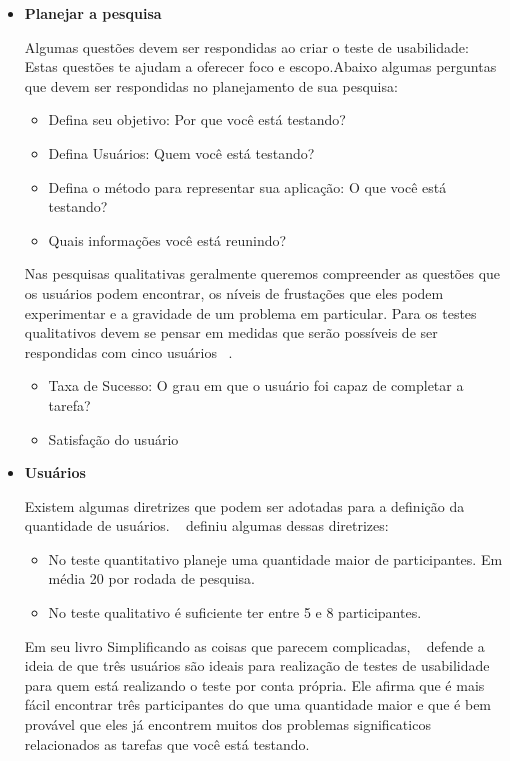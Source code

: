 \begin{itemize}
\item \textbf{Planejar a pesquisa}

Algumas questões devem ser respondidas ao criar o teste de usabilidade: Estas questões te ajudam a oferecer foco e escopo.Abaixo algumas perguntas que devem ser respondidas no planejamento de sua pesquisa:

\begin{itemize}
\item Defina seu objetivo: Por que você está testando? %
\item Defina Usuários: Quem você está testando? %
\item Defina o método para representar sua aplicação: O que você está testando?
\item Quais informações você está reunindo? 
\end{itemize}

Nas pesquisas qualitativas geralmente queremos compreender as questões que os usuários podem encontrar, os níveis de frustações que eles podem experimentar e a gravidade de um problema em particular. Para os testes qualitativos devem se pensar em medidas que serão possíveis de ser respondidas com cinco usuários ~\cite{unger2009}. 

	\begin{itemize}
		\item Taxa de Sucesso: O grau em que o usuário foi capaz de completar a tarefa?
		\item Satisfação do usuário
	\end{itemize}

\item \textbf{Usuários}

Existem algumas diretrizes que podem ser adotadas para a definição da quantidade de usuários. ~ definiu algumas dessas diretrizes:

\begin{itemize}
\item No teste quantitativo planeje uma quantidade maior de participantes. Em média 20 por rodada de pesquisa.
\item No teste qualitativo é suficiente ter entre 5 e 8 participantes.
\end{itemize}

	Em seu livro Simplificando as coisas que parecem complicadas, ~ defende a ideia de que três usuários são ideais para realização de testes de usabilidade para quem está realizando o teste por conta própria. Ele afirma que é mais fácil encontrar três participantes do que uma quantidade maior e que é bem provável que eles já encontrem muitos dos problemas significaticos relacionados as tarefas que você está testando.


\end{itemize}
